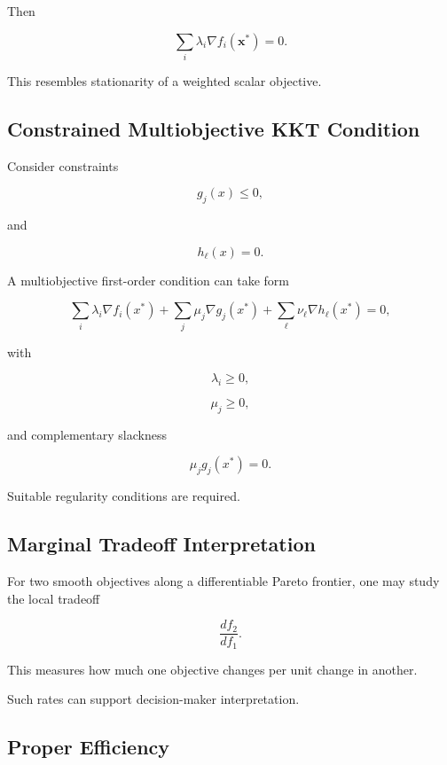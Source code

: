 Then

\[
\boxed{
\sum_i
\lambda_i
\nabla f_i(\mathbf{x}^*)
=
0.
}
\]

This resembles stationarity of a weighted scalar objective.

\subsection{Constrained Multiobjective KKT Condition}
\label{subsec:multiobjective-kkt}

Consider constraints

\[
g_j(x)\leq0,
\]

and

\[
h_\ell(x)=0.
\]

A multiobjective first-order condition can take form

\[
\boxed{
\sum_i
\lambda_i
\nabla f_i(x^*)
+
\sum_j
\mu_j
\nabla g_j(x^*)
+
\sum_\ell
\nu_\ell
\nabla h_\ell(x^*)
=
0,
}
\]

with

\[
\boxed{
\lambda_i\geq0,
}
\]

\[
\boxed{
\mu_j\geq0,
}
\]

and complementary slackness

\[
\boxed{
\mu_jg_j(x^*)=0.
}
\]

Suitable regularity conditions are required.

\subsection{Marginal Tradeoff Interpretation}
\label{subsec:marginal-tradeoff}

For two smooth objectives along a differentiable Pareto frontier, one may
study the local tradeoff

\[
\boxed{
\frac{
df_2
}{
df_1
}.
}
\]

This measures how much one objective changes per unit change in another.

Such rates can support decision-maker interpretation.

\subsection{Proper Efficiency}
\label{subsec:proper-efficiency}

